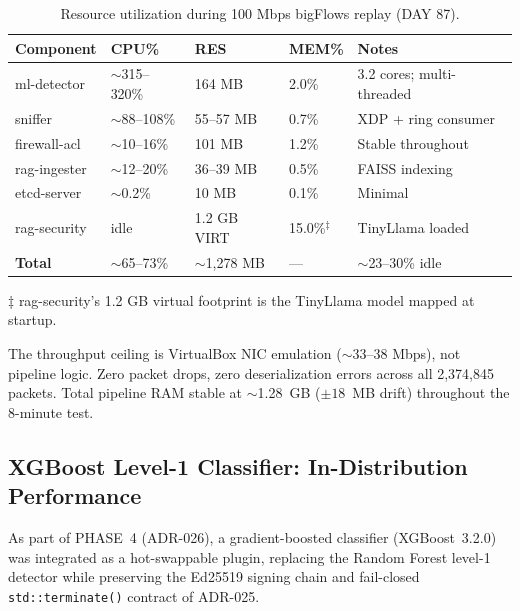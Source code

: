 \documentclass[11pt,a4paper]{article}
\begin{document}
    \begin{table}[h]
        \centering
        \caption{Resource utilization during 100 Mbps bigFlows replay (DAY 87).}
        \label{tab:resources}
        \begin{tabular}{lllll}
            \toprule
            \textbf{Component} & \textbf{CPU\%} & \textbf{RES} & \textbf{MEM\%} & \textbf{Notes} \\
            \midrule
            ml-detector       & ${\sim}$315--320\% & 164 MB    & 2.0\%  & 3.2 cores; multi-threaded \\
            sniffer           & ${\sim}$88--108\%  & 55--57 MB & 0.7\%  & XDP + ring consumer \\
            firewall-acl      & ${\sim}$10--16\%   & 101 MB    & 1.2\%  & Stable throughout \\
            rag-ingester      & ${\sim}$12--20\%   & 36--39 MB & 0.5\%  & FAISS indexing \\
            etcd-server       & ${\sim}$0.2\%      & 10 MB     & 0.1\%  & Minimal \\
            rag-security      & idle               & 1.2 GB VIRT & 15.0\%$^{\ddagger}$ & TinyLlama loaded \\
            \midrule
            \textbf{Total}    & ${\sim}$65--73\%   & ${\sim}$1,278 MB & --- & ${\sim}$23--30\% idle \\
            \bottomrule
        \end{tabular}
        \medskip
        \footnotesize{$\ddagger$ rag-security's 1.2 GB virtual footprint is the TinyLlama model
        mapped at startup.}
    \end{table}

    The throughput ceiling is VirtualBox NIC emulation (${\sim}$33--38 Mbps), not pipeline
    logic. Zero packet drops, zero deserialization errors across all 2,374,845 packets. Total
    pipeline RAM stable at ${\sim}$1.28~GB (${\pm}18$~MB drift) throughout the 8-minute test.

    \subsection{XGBoost Level-1 Classifier: In-Distribution Performance}
    \label{sec:eval:xgboost:id}

    As part of PHASE~4 (ADR-026), a gradient-boosted classifier (XGBoost~3.2.0) was integrated
    as a hot-swappable plugin, replacing the Random Forest level-1 detector while preserving the
    Ed25519 signing chain and fail-closed \texttt{std::terminate()} contract of ADR-025.
\end{document}
